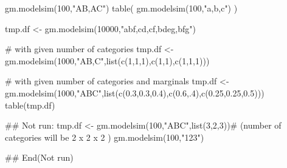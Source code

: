 \begin{Examples}
\begin{ExampleCode}
    gm.modelsim(100,"AB,AC")
    table( gm.modelsim(100,"a,b,c") )
    
    tmp.df <- gm.modelsim(10000,"abf,cd,cf,bdeg,bfg")
    
    # with given number of categories
    tmp.df <- gm.modelsim(1000,"AB,C",list(c(1,1,1),c(1,1),c(1,1,1)))

    # with given number of categories and marginals
    tmp.df <- gm.modelsim(1000,"ABC",list(c(0.3,0.3,0.4),c(0.6,.4),c(0.25,0.25,0.5)))
    table(tmp.df)

    ## Not run: 
tmp.df <- gm.modelsim(100,"ABC",list(3,2,3))# (number of categories will be 2 x 2 x 2 )
            gm.modelsim(100,"123")
            
## End(Not run)
\end{ExampleCode}
\end{Examples}


